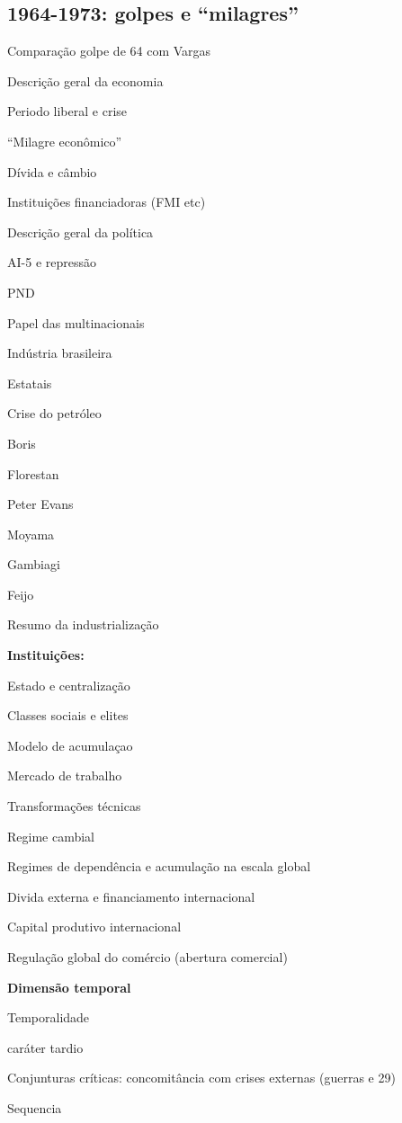 \subsection{1964-1973: golpes e ``milagres''}\label{golpes-e-milagres}

\begin{esboco}
Comparação golpe de 64 com Vargas

Descrição geral da economia

Periodo liberal e crise

``Milagre econômico''

Dívida e câmbio

Instituições financiadoras (FMI etc)

Descrição geral da política

AI-5 e repressão

PND

Papel das multinacionais

Indústria brasileira

Estatais

Crise do petróleo

Boris

Florestan

Peter Evans

Moyama

Gambiagi

Feijo

Resumo da industrialização

\textbf{Instituições:}

Estado e centralização

Classes sociais e elites

Modelo de acumulaçao

Mercado de trabalho

Transformações técnicas

Regime cambial

Regimes de dependência e acumulação na escala global

Divida externa e financiamento internacional

Capital produtivo internacional

Regulação global do comércio (abertura comercial)

\textbf{Dimensão temporal}

Temporalidade

caráter tardio

Conjunturas críticas: concomitância com crises externas (guerras e 29)

Sequencia


\end{esboco}
